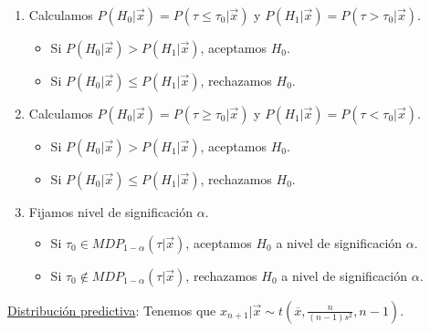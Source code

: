 \begin{enumerate}
    \item Calculamos $P(H_0 | \vec{x}) = P(\tau\leq \tau_0 |\vec{x})$ y $P(H_1 | \vec{x}) = P(\tau> \tau_0 | \vec{x})$.
    \begin{itemize}
        \item Si $P(H_0 | \vec{x}) > P(H_1 | \vec{x})$, aceptamos $H_0$.
        \item Si $P(H_0 | \vec{x}) \leq P(H_1 | \vec{x})$, rechazamos $H_0$.
    \end{itemize}
        \item Calculamos $P(H_0 | \vec{x}) = P(\tau \ge \tau_0 |\vec{x})$ y $P(H_1 | \vec{x}) = P(\tau< \tau_0 | \vec{x})$.
    \begin{itemize}
        \item Si $P(H_0 | \vec{x}) > P(H_1 | \vec{x})$, aceptamos $H_0$.
        \item Si $P(H_0 | \vec{x}) \leq P(H_1 | \vec{x})$, rechazamos $H_0$.
    \end{itemize}
    \item Fijamos nivel de significación $\alpha$.
    \begin{itemize}
        \item Si $\tau_0 \in MDP_{1 - \alpha}(\tau | \vec{x})$, aceptamos $H_0$ a nivel de significación $\alpha$.
        \item Si $\tau_0 \not\in MDP_{1 - \alpha}(\tau| \vec{x})$, rechazamos $H_0$ a nivel de significación $\alpha$.
    \end{itemize}
\end{enumerate}
\noindent \underline{Distribución predictiva}: Tenemos que $x_{n+1} | \vec{x} \sim t\left(\overline{x}, \frac{n}{(n-1)s^2},n-1 \right)$.
